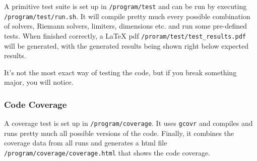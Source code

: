 A primitive test suite is set up in \texttt{/program/test} and can be run by executing \texttt{/program/test/run.sh}.
It will compile pretty much every possible combination of solvers, Riemann solvers, limiters, dimensions etc. and run some pre-defined tests.
When finished correctly, a LaTeX pdf \texttt{/proram/test/test_results.pdf} will be generated, with the generated results being shown right below expected results.

It's not the most exact way of testing the code, but if you break something major, you will notice.








\subsubsection*{Code Coverage}

A coverage test is set up in \texttt{/program/coverage}.
It uses \texttt{gcovr} and compiles and runs pretty much all possible versions of the code.
Finally, it combines the coverage data from all runs and generates a html  file \texttt{/program/coverage/coverage.html}
that shows the code coverage.